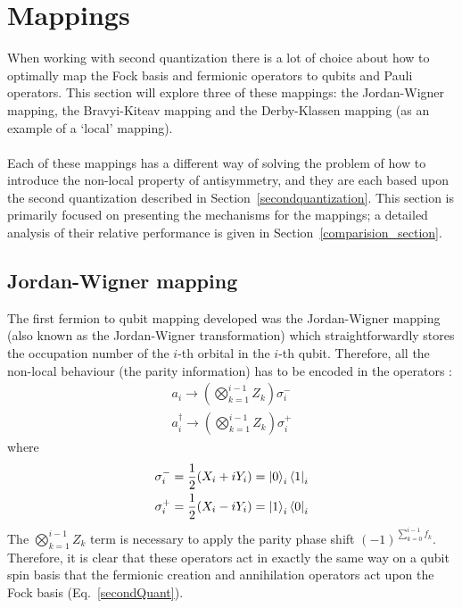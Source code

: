 \documentclass[twoside]{article}
\begin{document}
\section{Mappings} \label{mapping}
When working with second quantization there is a lot of choice about how to optimally map the Fock basis and fermionic operators to qubits and Pauli operators. This section will explore three of these mappings: the Jordan-Wigner mapping, the Bravyi-Kiteav mapping and the Derby-Klassen mapping (as an example of a `local' mapping).\\\\
Each of these mappings has a different way of solving the problem of how to introduce the non-local property of antisymmetry, and they are each based upon the second quantization described in Section~\ref{secondquantization}. This section is primarily focused on presenting the mechanisms for the mappings; a detailed analysis of their relative performance is given in Section~\ref{comparision_section}.
\subsection{Jordan-Wigner mapping}\label{jordan-wigner_section}
The first fermion to qubit mapping developed was the Jordan-Wigner mapping (also known as the Jordan-Wigner transformation) which straightforwardly stores the occupation number of the $i$-th orbital in the $i$-th qubit. Therefore, all the non-local behaviour (the parity information) has to be encoded in the operators \cite{fermionicEncoding}:
\begin{equation}
        \begin{align}
        a_i \rightarrow \left( \bigotimes_{k=1}^{i-1} Z_k \right) \sigma_i^-\\
        a^{\dagger}_i \rightarrow \left( \bigotimes_{k=1}^{i-1} Z_k \right) \sigma_i^+
\end{align}
\end{equation}
where
\begin{equation}
        \begin{align}
                \sigma^-_i = \frac{1}{2} (X_i + i Y_i) = \ket{0}_i \bra{1}_i\\
                \sigma^+_i = \frac{1}{2} (X_i - i Y_i) = \ket{1}_i \bra{0}_i 
        \end{align}
\end{equation}
The $\bigotimes_{k=1}^{i-1} Z_k$ term is necessary to apply the parity phase shift $(-1)^{\sum_{k=0}^{i-1} f_k}$. Therefore, it is clear that these operators act in exactly the same way on a qubit spin basis that the fermionic creation and annihilation operators act upon the Fock basis (Eq.~\ref{secondQuant}).
\end{document}
